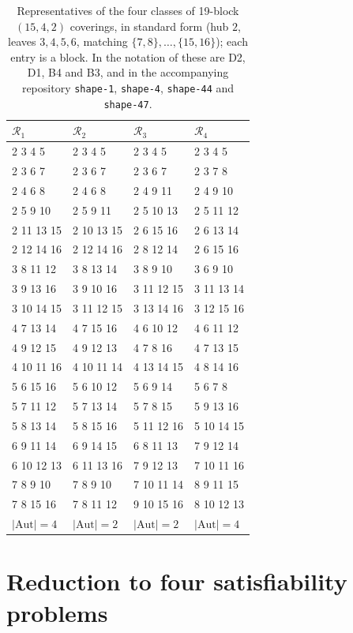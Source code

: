 \documentclass[11pt]{amsart}
\theoremstyle{definition}
\theoremstyle{remark}
\newcommand{\cR}{\mathcal{R}}
\begin{document}
\begin{table}[ht]
\centering
\small
\caption{Representatives of the four classes of 19-block $(15,4,2)$
coverings, in standard form (hub $2$, leaves $3,4,5,6$, matching
$\{7,8\},\dots,\{15,16\}$); each entry is a block. In the notation of
\cite{allston1988} these are D2, D1, B4 and B3, and in the accompanying
repository \texttt{shape-1}, \texttt{shape-4}, \texttt{shape-44} and
\texttt{shape-47}.}\label{tab:reps}
\begin{tabular}{@{}llll@{}}
\toprule
$\cR_1$ & $\cR_2$ & $\cR_3$ & $\cR_4$\\
\midrule
2 3 4 5   & 2 3 4 5   & 2 3 4 5   & 2 3 4 5\\
2 3 6 7   & 2 3 6 7   & 2 3 6 7   & 2 3 7 8\\
2 4 6 8   & 2 4 6 8   & 2 4 9 11  & 2 4 9 10\\
2 5 9 10  & 2 5 9 11  & 2 5 10 13 & 2 5 11 12\\
2 11 13 15& 2 10 13 15& 2 6 15 16 & 2 6 13 14\\
2 12 14 16& 2 12 14 16& 2 8 12 14 & 2 6 15 16\\
3 8 11 12 & 3 8 13 14 & 3 8 9 10  & 3 6 9 10\\
3 9 13 16 & 3 9 10 16 & 3 11 12 15& 3 11 13 14\\
3 10 14 15& 3 11 12 15& 3 13 14 16& 3 12 15 16\\
4 7 13 14 & 4 7 15 16 & 4 6 10 12 & 4 6 11 12\\
4 9 12 15 & 4 9 12 13 & 4 7 8 16  & 4 7 13 15\\
4 10 11 16& 4 10 11 14& 4 13 14 15& 4 8 14 16\\
5 6 15 16 & 5 6 10 12 & 5 6 9 14  & 5 6 7 8\\
5 7 11 12 & 5 7 13 14 & 5 7 8 15  & 5 9 13 16\\
5 8 13 14 & 5 8 15 16 & 5 11 12 16& 5 10 14 15\\
6 9 11 14 & 6 9 14 15 & 6 8 11 13 & 7 9 12 14\\
6 10 12 13& 6 11 13 16& 7 9 12 13 & 7 10 11 16\\
7 8 9 10  & 7 8 9 10  & 7 10 11 14& 8 9 11 15\\
7 8 15 16 & 7 8 11 12 & 9 10 15 16& 8 10 12 13\\
\midrule
$|\mathrm{Aut}|=4$ & $|\mathrm{Aut}|=2$ & $|\mathrm{Aut}|=2$ &
$|\mathrm{Aut}|=4$\\
\bottomrule
\end{tabular}
\end{table}

\section{Reduction to four satisfiability problems}\label{sec:reduction}
\end{document}
